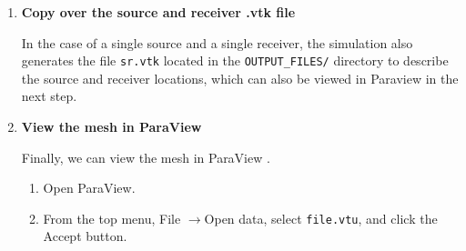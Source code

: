 \begin{enumerate}
\begin{enumerate}
\item We next convert the \texttt{.mesh} file into the VTU (Unstructured
grid file) format which can be viewed in ParaView. For this task,
you can use and modify the script \texttt{mesh2vtu.pl} located in
directory \texttt{utils/Visualization/Paraview/}, for example:

\begin{lyxcode}
{\footnotesize mesh2vtu.pl~-i~file.mesh~-o~file.vtu~}{\footnotesize \par}
\end{lyxcode}
\item Notice that this Perl script uses a program \texttt{mesh2vtu} in the
\texttt{utils/Visualization/Paraview/mesh2vtu} directory, which further
uses the VTK  run-time library
for its execution. Therefore, make sure you have them properly set
in the script according to your system.
\end{enumerate}
\item \textbf{Copy over the source and receiver .vtk file}


In the case of a single source and a single receiver, the simulation
also generates the file \texttt{sr.vtk} located in the \texttt{OUTPUT\_FILES/}
directory to describe the source and receiver locations, which can
also be viewed in Paraview in the next step.

\item \textbf{View the mesh in ParaView}


Finally, we can view the mesh in ParaView .
\begin{enumerate}
\item Open ParaView.
\item From the top menu, \textsf{File} $\rightarrow$\textsf{Open data},
select \texttt{file.vtu}, and click the \textsf{Accept} button.


\end{enumerate}
\end{enumerate}

